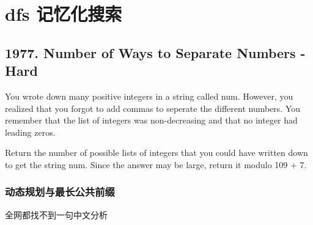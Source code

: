 \documentclass[9pt, b5paaper]{book}
\begin{document}
\chapter{dfs 记忆化搜索}
\label{sec-15}
\section{1977. Number of Ways to Separate Numbers - Hard}
\label{sec-15-1}
You wrote down many positive integers in a string called num. However, you realized that you forgot to add commas to seperate the different numbers. You remember that the list of integers was non-decreasing and that no integer had leading zeros.

Return the number of possible lists of integers that you could have written down to get the string num. Since the answer may be large, return it modulo 109 + 7.
\subsection{动态规划与最长公共前缀}
\label{sec-15-1-1}

全网都找不到一句中文分析
\end{document}
